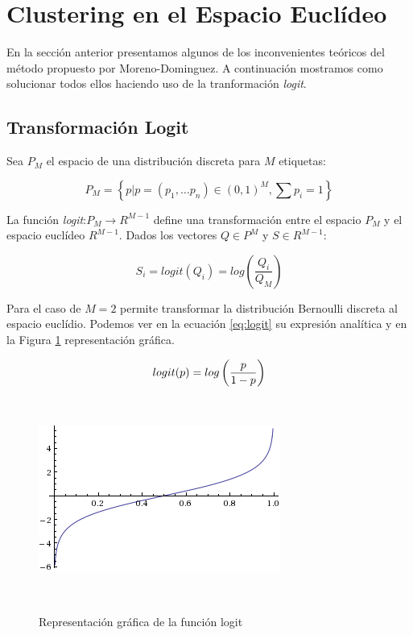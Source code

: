 \section{Clustering en el Espacio Eucl\'ideo}

En la secci\'on anterior presentamos algunos de los inconvenientes te\'oricos 
del m\'etodo propuesto por Moreno-Dominguez. A continuaci\'on mostramos como 
solucionar todos ellos haciendo uso de la tranformaci\'on \textit{logit}. \\

\subsection{Transformaci\'on Logit}

Sea $P_M$ el espacio de una distribuci\'on discreta para $M$ etiquetas: 

$$P_M = \left\{  p | p = (p_1,\dots p_n) \in (0,1)^M , \sum{p_i} = 1 \right\}$$

La funci\'on \textit{logit}:$P_M \rightarrow R^{M-1}$ define una transformaci\'on
entre el espacio $P_M$ y el espacio eucl\'ideo $R^{M-1}$. Dados los vectores $Q \in P^M$ y
$S \in R^{M-1}$:

$$S_i = logit(Q_i) = log\left(\frac{Q_i}{Q_M}\right)$$

Para el caso de $M=2$ permite transformar la distribuci\'on Bernoulli
discreta al espacio eucl\'idio. Podemos ver en la ecuaci\'on \ref{eq:logit} su
expresi\'on anal\'itica y en la Figura \ref{fig:dominio} representaci\'on 
gr\'afica.

\begin{figure}[h!]

\begin{minipage}[b]{0.45\textwidth}

    \begin{equation}
    \vspace{2.85cm}
        \label{eq:logit}
    logit(p) = log\left(\frac{p}{1-p}\right)
    \end{equation}
\end{minipage} ~
\hfill
\begin{minipage}[b]{0.45\textwidth}
    \includegraphics[width=\textwidth]{img/logit.png}
    \caption{Representaci\'on gr\'afica de la funci\'on logit}
    \label{fig:dominio}
\end{minipage} ~

\end{figure}  

